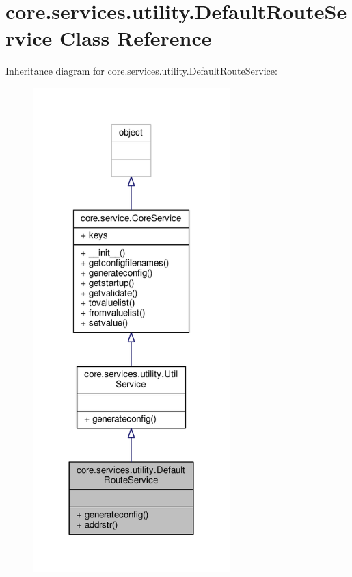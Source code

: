 \hypertarget{classcore_1_1services_1_1utility_1_1_default_route_service}{\section{core.\+services.\+utility.\+Default\+Route\+Service Class Reference}
\label{classcore_1_1services_1_1utility_1_1_default_route_service}
}


Inheritance diagram for core.\+services.\+utility.\+Default\+Route\+Service\+:
\nopagebreak
\begin{figure}[H]
\begin{center}
\leavevmode
\includegraphics[width=216pt]{classcore_1_1services_1_1utility_1_1_default_route_service__inherit__graph}
\end{center}
\end{figure}


